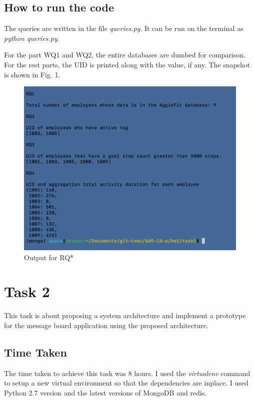 \documentclass[letterpaper]{article}
\begin{document}
\subsection{How to run the code}

The queries are written in the file \textit{queries.py}. It can be run on the terminal as \textit{python queries.py}. 

For the part WQ1 and WQ2, the entire databases are dumbed for comparison. For the rest parts, the UID is printed along with the value, if any. The snapshot is shown in Fig. 1.  

\begin{figure}
	\centering
	\includegraphics[width=1\textwidth]{1.png}
	\caption{\label{fig:data}Output for RQ*}
\end{figure}

\newpage 

\section{Task 2}

This task is about proposing a system architecture and implement a prototype for the message board application using the proposed architecture.

\subsection{Time Taken}

The time taken to achieve this task was 8 hours. I used the \textit{virtualenv} command to setup a new virtual environment so that the dependencies are inplace. I used Python 2.7 version and the latest versions of MongoDB and redis.
\end{document}
